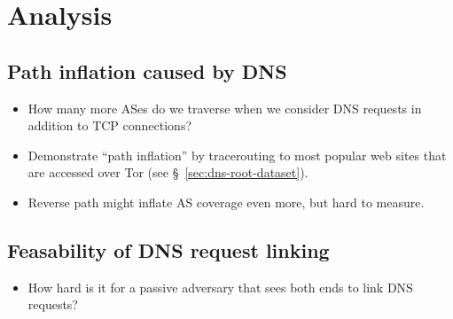 \section{Analysis}
\label{sec:analysis}

\subsection{Path inflation caused by DNS}
\begin{itemize}
	\item How many more ASes do we traverse when we consider DNS requests in
		addition to TCP connections?
	\item Demonstrate ``path inflation'' by tracerouting to most popular web
		sites that are accessed over Tor (see \S~\ref{sec:dns-root-dataset}).
	\item Reverse path might inflate AS coverage even more, but hard to measure.
\end{itemize}

\subsection{Feasability of DNS request linking}
\begin{itemize}
	\item How hard is it for a passive adversary that sees both ends to link DNS
		requests?
\end{itemize}
